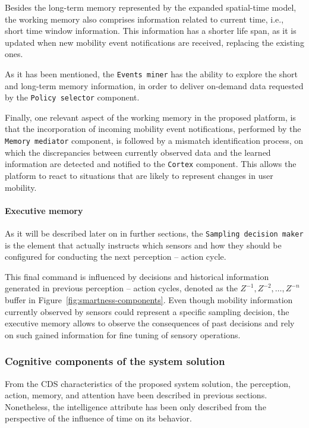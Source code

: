 \documentclass[ENG,PhD]{cinvestav}
\begin{document}
Besides the long-term memory represented by the expanded spatial-time model, the working memory also comprises information related to current time, i.e., short time window information.
This information has a shorter life span, as it is updated when new mobility event notifications are received, replacing the existing ones. 

As it has been mentioned, the \texttt{Events miner} has the ability to explore the short and long-term memory information, in order to deliver on-demand data requested by the \texttt{Policy selector} component.

Finally, one relevant aspect of the working memory in the proposed platform, is that the incorporation of incoming mobility event notifications, performed by the \texttt{Memory mediator} component, is followed by a mismatch identification process, on which the discrepancies between currently observed data and the learned information are detected and notified to the \texttt{Cortex} component.
This allows the platform to react to situations that are likely to represent changes in user mobility.

\paragraph*{Executive memory}
As it will be described later on in further sections, the \texttt{Sampling decision maker} is the element that actually instructs which sensors and how they should be configured for conducting the next perception -- action cycle.

This final command is influenced by decisions and historical information generated in previous perception -- action cycles, denoted as the $Z^{-1},Z^{-2},\ldots,Z^{-n}$ buffer in Figure~\ref{fig:smartness-components}.
Even though mobility information currently observed by sensors could represent a specific sampling decision, the executive memory allows to observe the consequences of past decisions and rely on such gained information for fine tuning of sensory operations.


\subsubsection{Cognitive components of the system solution}
From the CDS characteristics of the proposed system solution, the perception, action, memory, and attention have been described in previous sections.
Nonetheless, the intelligence attribute has been only described from the perspective of the influence of time on its behavior.
\end{document}
